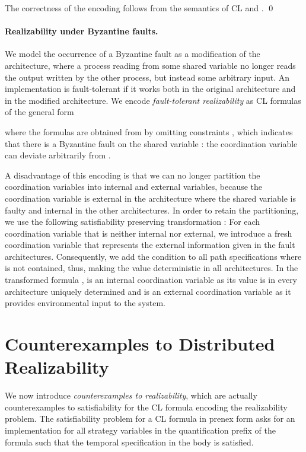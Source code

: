 \documentclass{LMCS}
\theoremstyle{plain}\newtheorem{theorem}[thm]{Theorem}
\theoremstyle{plain}\newtheorem{lemma}[thm]{Lemma}
\theoremstyle{plain}\newtheorem{proposition}[thm]{Proposition}
\theoremstyle{plain}\newtheorem{corollary}[thm]{Corollary}
\theoremstyle{definition}\newtheorem{definition}{Definition}[section]
\begin{document}
The correctness of the encoding follows from the semantics of CL and .
\qed

\paragraph{\bf Realizability under Byzantine faults.} 
\label{sec:multiple-architecture-realizability}
We model the occurrence of a Byzantine fault as a modification of the architecture, where a process reading from some shared variable no longer reads the output written by the other process, but instead some arbitrary input. An implementation is fault-tolerant if it works both in the original architecture and in the modified architecture.
We encode \emph{fault-tolerant realizability} as   CL formulas of the general form

where the formulas  are obtained from  by omitting constraints , which indicates that there is a Byzantine fault on the shared variable : 
the coordination variable  can deviate arbitrarily from .

A disadvantage of this encoding is that we can no longer partition the coordination variables into internal and external variables, because the 
coordination variable  is external in the architecture where the shared variable is faulty and internal in the other architectures.
In order to retain the partitioning, we use the following satisfiability preserving transformation :
For each coordination variable  that is neither internal nor external, we introduce a fresh coordination variable  that represents the external information given in the fault architectures.
Consequently, we add the condition  to all path specifications  where  is not contained, thus, making the value  deterministic in all architectures.
In the transformed formula ,  is an internal coordination variable as its value is in every architecture uniquely determined and  is an external coordination variable as it provides environmental input to the system.


\section{Counterexamples to Distributed Realizability} \label{sec:counterexamples}
We now introduce \emph{counterexamples to realizability}, which are actually {counterexamples to satisfiability} for the CL formula encoding the realizability problem.
The satisfiability problem for a CL formula in prenex form asks for an implementation for all strategy variables in the quantification prefix of the formula such that the temporal specification in the body is satisfied.
\end{document}
